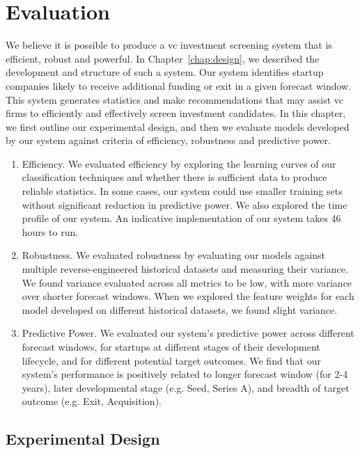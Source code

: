 \documentclass[../thesis/thesis.tex]{subfiles}
\begin{document}
\chapter{Evaluation}
\label{chap:evaluation}

We believe it is possible to produce a \gls{vc} investment screening system that is efficient, robust and powerful. In Chapter~\ref{chap:design}, we described the development and structure of such a system. Our system identifies startup companies likely to receive additional funding or exit in a given forecast window. This system generates statistics and make recommendations that may assist \gls{vc} firms to efficiently and effectively screen investment candidates. In this chapter, we first outline our experimental design, and then we evaluate models developed by our system against criteria of efficiency, robustness and predictive power.

\begin{enumerate}

\item Efficiency. We evaluated efficiency by exploring the learning curves of our classification techniques and whether there is sufficient data to produce reliable statistics. In some cases, our system could use smaller training sets without significant reduction in predictive power. We also explored the time profile of our system. An indicative implementation of our system takes 46 hours to run.

\item Robustness. We evaluated robustness by evaluating our models against multiple reverse-engineered historical datasets and measuring their variance. We found variance evaluated across all metrics to be low, with more variance over shorter forecast windows. When we explored the feature weights for each model developed on different historical datasets, we found slight variance.

\item Predictive Power. We evaluated our system's predictive power across different forecast windows, for startups at different stages of their development lifecycle, and for different potential target outcomes. We find that our system's performance is positively related to longer forecast window (for 2-4 years), later developmental stage (e.g. Seed, Series A), and breadth of target outcome (e.g. Exit, Acquisition).

\end{enumerate}

\section{Experimental Design}
\end{document}
